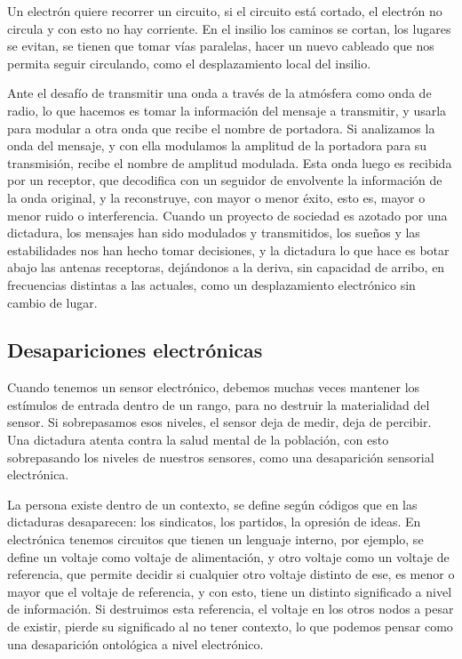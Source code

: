 \documentclass[./informes.tex]{subfiles}
\begin{document}
Un electrón quiere recorrer un circuito, si el circuito está cortado, el electrón no circula y con esto no hay corriente. En el insilio los caminos se cortan, los lugares se evitan, se tienen que tomar vías paralelas, hacer un nuevo cableado que nos permita seguir circulando, como el desplazamiento local del insilio.

Ante el desafío de transmitir una onda a través de la atmósfera como onda de radio, lo que hacemos es tomar la información del mensaje a transmitir, y usarla para modular a otra onda que recibe el nombre de portadora. Si analizamos la onda del mensaje, y con ella modulamos la amplitud de la portadora para su transmisión, recibe el nombre de amplitud modulada. Esta onda luego es recibida por un receptor, que decodifica con un seguidor de envolvente la información de la onda original, y la reconstruye, con mayor o menor éxito, esto es, mayor o menor ruido o interferencia. Cuando un proyecto de sociedad es azotado por una dictadura, los mensajes han sido modulados y transmitidos, los sueños y las estabilidades nos han hecho tomar decisiones, y la dictadura lo que hace es botar abajo las antenas receptoras, dejándonos a la deriva, sin capacidad de arribo, en frecuencias distintas a las actuales, como un desplazamiento electrónico sin cambio de lugar.

\subsection{Desapariciones electrónicas}

Cuando tenemos un sensor electrónico, debemos muchas veces mantener los estímulos de entrada dentro de un rango, para no destruir la materialidad del sensor. Si sobrepasamos esos niveles, el sensor deja de medir, deja de percibir. Una dictadura atenta contra la salud mental de la población, con esto sobrepasando los niveles de nuestros sensores, como una desaparición sensorial electrónica.

La persona existe dentro de un contexto, se define según códigos que en las dictaduras desaparecen: los sindicatos, los partidos, la opresión de ideas. En electrónica tenemos circuitos que tienen un lenguaje interno, por ejemplo, se define un voltaje como voltaje de alimentación, y otro voltaje como un voltaje de referencia, que permite decidir si cualquier otro voltaje distinto de ese, es menor o mayor que el voltaje de referencia, y con esto, tiene un distinto significado a nivel de información. Si destruimos esta referencia, el voltaje en los otros nodos a pesar de existir, pierde su significado al no tener contexto, lo que podemos pensar como una desaparición ontológica a nivel electrónico.
\end{document}
